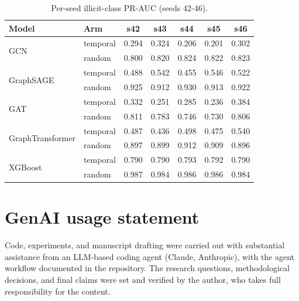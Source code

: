 \documentclass{article}
\begin{document}
\begin{table}[h]
\centering
\caption{Per-seed illicit-class PR-AUC (seeds 42-46).}
\label{tab:perseed}
\small
\begin{tabular}{llccccc}
\toprule
Model & Arm & s42 & s43 & s44 & s45 & s46 \\
\midrule
\multirow{2}{*}{GCN} & temporal & 0.294 & 0.324 & 0.206 & 0.201 & 0.302 \\
 & random & 0.800 & 0.820 & 0.824 & 0.822 & 0.823 \\
\multirow{2}{*}{GraphSAGE} & temporal & 0.488 & 0.542 & 0.455 & 0.546 & 0.522 \\
 & random & 0.925 & 0.912 & 0.930 & 0.913 & 0.922 \\
\multirow{2}{*}{GAT} & temporal & 0.332 & 0.251 & 0.285 & 0.236 & 0.384 \\
 & random & 0.811 & 0.783 & 0.746 & 0.730 & 0.806 \\
\multirow{2}{*}{GraphTransformer} & temporal & 0.487 & 0.436 & 0.498 & 0.475 & 0.540 \\
 & random & 0.897 & 0.899 & 0.912 & 0.909 & 0.896 \\
\multirow{2}{*}{XGBoost} & temporal & 0.790 & 0.790 & 0.793 & 0.792 & 0.790 \\
 & random & 0.987 & 0.984 & 0.986 & 0.986 & 0.984 \\
\bottomrule
\end{tabular}
\end{table}

\section{GenAI usage statement}
Code, experiments, and manuscript drafting were carried out with substantial
assistance from an LLM-based coding agent (Claude, Anthropic), with the agent
workflow documented in the repository. The research questions, methodological
decisions, and final claims were set and verified by the author, who takes
full responsibility for the content.
\end{document}
